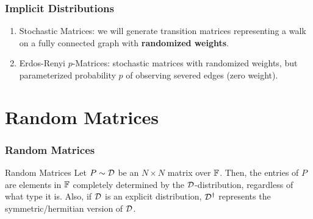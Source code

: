 %
%
\begin{frame} \frametitle{Implicit Distributions}

\begin{enumerate}
  \item Stochastic Matrices: we will generate transition matrices representing a walk on a fully connected graph with \textbf{randomized weights}.
  \item Erdos-Renyi $p$-Matrices: stochastic matrices with randomized weights, but parameterized probability $p$ of observing severed edges (zero weight).
\end{enumerate}

\end{frame}


\section{Random Matrices}
\begin{frame} \frametitle{Random Matrices}

\begin{alertblock}{Random Matrices}
Let $P \sim \mathcal{D}$ be an $N \times N$ matrix over $\mathbb{F}$. Then, the entries of $P$ are elements in $\mathbb{F}$ completely determined by the $\mathcal{D}$-distribution, regardless of what type it is.
Also, if $\mathcal{D}$ is an explicit distribution, $\mathcal{D}^\dagger$ represents the symmetric/hermitian version of $\mathcal{D}$.
\end{alertblock}
\end{frame}

